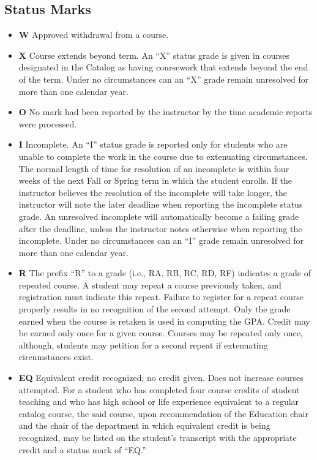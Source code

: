 \documentclass[
  letterpaper,
]{scrbook}
\providecommand{\tightlist}{%
  \setlength{\itemsep}{0pt}\setlength{\parskip}{0pt}}
\begin{document}
\subsection{Status Marks}\label{status-marks}

\begin{itemize}
\tightlist
\item
  \textbf{W} Approved withdrawal from a course.
\item
  \textbf{X} Course extends beyond term. An ``X'' status grade is given
  in courses designated in the Catalog as having coursework that extends
  beyond the end of the term. Under no circumstances can an ``X'' grade
  remain unresolved for more than one calendar year.
\item
  \textbf{O} No mark had been reported by the instructor by the time
  academic reports were processed.
\item
  \textbf{I} Incomplete. An ``I'' status grade is reported only for
  students who are unable to complete the work in the course due to
  extenuating circumstances. The normal length of time for resolution of
  an incomplete is within four weeks of the next Fall or Spring term in
  which the student enrolls. If the instructor believes the resolution
  of the incomplete will take longer, the instructor will note the later
  deadline when reporting the incomplete status grade. An unresolved
  incomplete will automatically become a failing grade after the
  deadline, unless the instructor notes otherwise when reporting the
  incomplete. Under no circumstances can an ``I'' grade remain
  unresolved for more than one calendar year.
\item
  \textbf{R} The prefix ``R'' to a grade (i.e., RA, RB, RC, RD, RF)
  indicates a grade of repeated course. A student may repeat a course
  previously taken, and registration must indicate this repeat. Failure
  to register for a repeat course properly results in no recognition of
  the second attempt. Only the grade earned when the course is retaken
  is used in computing the GPA. Credit may be earned only once for a
  given course. Courses may be repeated only once, although, students
  may petition for a second repeat if extenuating circumstances exist.
\item
  \textbf{EQ} Equivalent credit recognized; no credit given. Does not
  increase courses attempted. For a student who has completed four
  course credits of student teaching and who has high school or life
  experience equivalent to a regular catalog course, the said course,
  upon recommendation of the Education chair and the chair of the
  department in which equivalent credit is being recognized, may be
  listed on the student's transcript with the appropriate credit and a
  status mark of ``EQ.''
\end{itemize}
\end{document}
